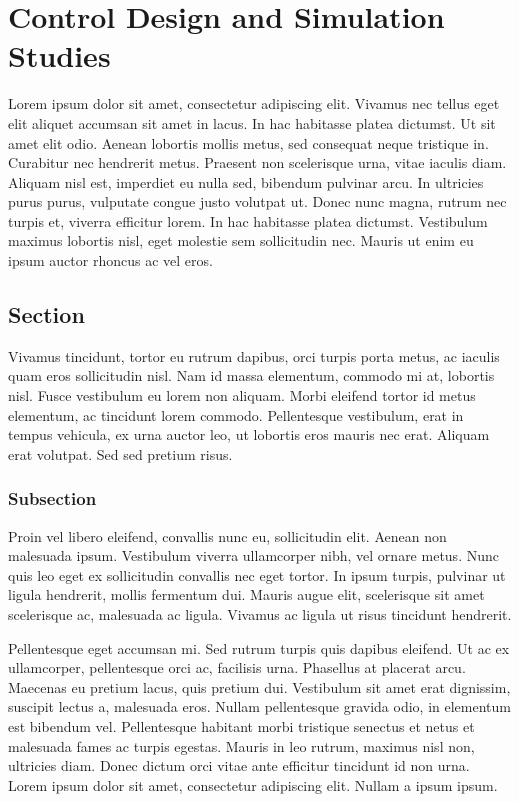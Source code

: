 \chapter{Control Design and Simulation Studies}
\label{chapter3}

Lorem ipsum dolor sit amet, consectetur adipiscing elit. Vivamus nec tellus eget elit aliquet accumsan sit amet in lacus. In hac habitasse platea dictumst. Ut sit amet elit odio. Aenean lobortis mollis metus, sed consequat neque tristique in. Curabitur nec hendrerit metus. Praesent non scelerisque urna, vitae iaculis diam. Aliquam nisl est, imperdiet eu nulla sed, bibendum pulvinar arcu. In ultricies purus purus, vulputate congue justo volutpat ut. Donec nunc magna, rutrum nec turpis et, viverra efficitur lorem. In hac habitasse platea dictumst. Vestibulum maximus lobortis nisl, eget molestie sem sollicitudin nec. Mauris ut enim eu ipsum auctor rhoncus ac vel eros.

\section{Section}
Vivamus tincidunt, tortor eu rutrum dapibus, orci turpis porta metus, ac iaculis quam eros sollicitudin nisl. Nam id massa elementum, commodo mi at, lobortis nisl. Fusce vestibulum eu lorem non aliquam. Morbi eleifend tortor id metus elementum, ac tincidunt lorem commodo. Pellentesque vestibulum, erat in tempus vehicula, ex urna auctor leo, ut lobortis eros mauris nec erat. Aliquam erat volutpat. Sed sed pretium risus.

\subsection[Subsection.]{Subsection}
Proin vel libero eleifend, convallis nunc eu, sollicitudin elit. Aenean non malesuada ipsum. Vestibulum viverra ullamcorper nibh, vel ornare metus. Nunc quis leo eget ex sollicitudin convallis nec \cite{Maeda1999} eget tortor. In ipsum turpis, pulvinar ut ligula hendrerit, mollis fermentum dui. Mauris augue elit, scelerisque sit amet scelerisque ac, malesuada ac ligula. Vivamus ac ligula ut risus tincidunt hendrerit.

Pellentesque eget accumsan mi. Sed rutrum turpis quis dapibus eleifend. Ut ac ex ullamcorper, pellentesque orci ac, facilisis urna. Phasellus at placerat arcu. Maecenas eu pretium lacus, quis pretium dui. Vestibulum sit amet erat dignissim, suscipit lectus a, malesuada eros. Nullam pellentesque gravida odio, in elementum est bibendum vel. Pellentesque habitant morbi tristique senectus et netus et malesuada fames ac turpis egestas. Mauris in leo rutrum, maximus nisl non, ultricies diam. Donec dictum orci vitae ante efficitur tincidunt id non urna. Lorem ipsum dolor sit amet, consectetur adipiscing elit. Nullam a ipsum ipsum.